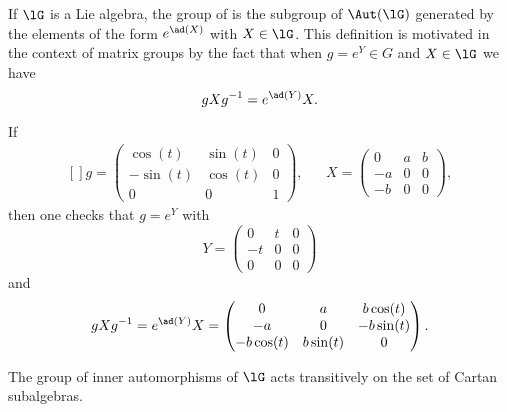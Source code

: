 If \( \lG\) is a Lie algebra, the group of  is the subgroup of \( \Aut(\lG)\) generated by the elements of the form \(  e^{\ad(X)}\) with \( X\in\lG\). This definition is motivated in the context of matrix groups by the fact that when \( g= e^{Y}\in G\) and \( X\in\lG\) we have
\begin{equation}
    gXg^{-1}= e^{\ad(Y)}X.
\end{equation}
\begin{example}
    If 
    \begin{equation}
        \begin{aligned}[]
            g=\begin{pmatrix}
                \cos(t)    &   \sin(t)    &   0    \\
                -\sin(t)    &   \cos(t)    &   0    \\
                0    &   0    &   1
            \end{pmatrix},&&X=\begin{pmatrix}
                0    &   a    &   b    \\
                -a    &   0    &   0    \\
                -b    &   0    &   0
            \end{pmatrix},
        \end{aligned}
    \end{equation}
    then one checks that \( g= e^{Y}\) with
    \begin{equation}
        Y=\begin{pmatrix}
              0  &  t     &   0    \\
            -t    &   0    &   0    \\
            0    &   0    &   0
        \end{pmatrix}
    \end{equation}
    and 
    \begin{equation}
        gXg^{-1}= e^{\ad(Y)}X=\begin{pmatrix}
            0    &   a    &   b\cos(t)    \\
            -a    &   0    &   -b\sin(t)    \\
            -b\cos(t)    &   b\sin(t)    &   0
        \end{pmatrix}.
    \end{equation}
\end{example}

\begin{theorem}
    The group of inner automorphisms of \( \lG\) acts transitively on the set of Cartan subalgebras. 
\end{theorem}

